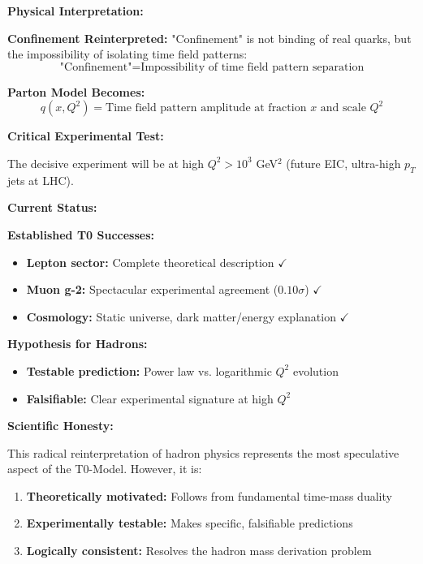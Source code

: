 \documentclass[12pt,a4paper]{report}
\begin{document}
\textbf{Physical Interpretation:}

\textbf{Confinement Reinterpreted:}
"Confinement" is not binding of real quarks, but the impossibility of isolating time field patterns:
\begin{equation}
	\text{"Confinement"} = \text{Impossibility of time field pattern separation}
\end{equation}

\textbf{Parton Model Becomes:}
\begin{equation}
	q(x,Q^2) = \text{Time field pattern amplitude at fraction } x \text{ and scale } Q^2
\end{equation}

\textbf{Critical Experimental Test:}

The decisive experiment will be at high $Q^2 > 10^3$ GeV$^2$ (future EIC, ultra-high $p_T$ jets at LHC).



\textbf{Current Status:}

\textbf{Established T0 Successes:}
\begin{itemize}
	\item \textbf{Lepton sector:} Complete theoretical description $\checkmark$
	\item \textbf{Muon g-2:} Spectacular experimental agreement ($0.10\sigma$) $\checkmark$
	\item \textbf{Cosmology:} Static universe, dark matter/energy explanation $\checkmark$
\end{itemize}

\textbf{Hypothesis for Hadrons:}
\begin{itemize}
	\item \textbf{Testable prediction:} Power law vs. logarithmic $Q^2$ evolution
	\item \textbf{Falsifiable:} Clear experimental signature at high $Q^2$

\end{itemize}

\textbf{Scientific Honesty:}

This radical reinterpretation of hadron physics represents the most speculative aspect of the T0-Model. However, it is:
\begin{enumerate}
	\item \textbf{Theoretically motivated:} Follows from fundamental time-mass duality
	\item \textbf{Experimentally testable:} Makes specific, falsifiable predictions
	\item \textbf{Logically consistent:} Resolves the hadron mass derivation problem
\end{enumerate}
\end{document}

